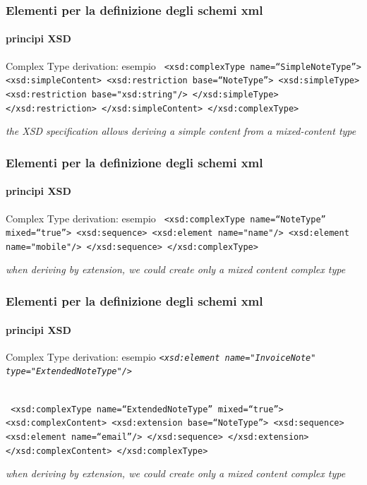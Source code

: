 \begin{frame}
	\frametitle{Elementi per la definizione degli schemi xml}
	\framesubtitle{principi XSD}
	\addtocounter{nframe}{1}

	\begin{block}{Complex Type derivation: esempio}
		\texttt{
			<xsd:complexType name=``SimpleNoteType''>
			<xsd:simpleContent>
			<xsd:restriction base=``NoteType''>
			<xsd:simpleType>
			<xsd:restriction base="xsd:string"/>
			</xsd:simpleType>
			</xsd:restriction>
			</xsd:simpleContent>
			</xsd:complexType>
		}
	\end{block}
	\textit{the XSD specification allows deriving a simple content from a mixed-content type}
\end{frame}



\begin{frame}
	\frametitle{Elementi per la definizione degli schemi xml}
	\framesubtitle{principi XSD}
	\addtocounter{nframe}{1}

	\begin{block}{Complex Type derivation: esempio}
		\texttt{
			<xsd:complexType name=``NoteType'' mixed=``true''>
			<xsd:sequence>
			<xsd:element name="name"/>
			<xsd:element name="mobile"/>
			</xsd:sequence>
			</xsd:complexType>
		}
	\end{block}
	\textit{when deriving by extension, we could create only a mixed content complex type}
\end{frame}


\begin{frame}
	\frametitle{Elementi per la definizione degli schemi xml}
	\framesubtitle{principi XSD}
	\addtocounter{nframe}{1}

	\begin{block}{Complex Type derivation: esempio}
		\texttt{\emph{<xsd:element name="InvoiceNote" type="ExtendedNoteType"/>}}


		\\\texttt{
			<xsd:complexType name=``ExtendedNoteType'' mixed=``true''>
			<xsd:complexContent>
			<xsd:extension base=``NoteType''>
			<xsd:sequence>
			<xsd:element name=``email''/>
			</xsd:sequence>
			</xsd:extension>
			</xsd:complexContent>
			</xsd:complexType>
		}
	\end{block}
	\textit{when deriving by extension, we could create only a mixed content complex type}
\end{frame}

